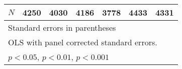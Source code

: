 \begin{table}[htbp]
\begin{tabular}{l*{6}{c}}
\hline
\(N\)       &        4250         &        4030         &        4186         &        3778         &        4433         &        4331         \\
\hline\hline
\multicolumn{7}{l}{\footnotesize Standard errors in parentheses}\\
\multicolumn{7}{l}{\footnotesize OLS with panel corrected standard errors.}\\
\multicolumn{7}{l}{\footnotesize \sym{*} \(p<0.05\), \sym{**} \(p<0.01\), \sym{***} \(p<0.001\)}\\
\end{tabular}
\end{table}
